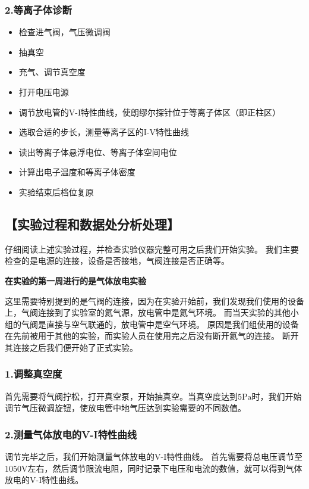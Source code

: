\documentclass[12pt,a4paper,UTF8]{ctexart}
\begin{document}
\subsubsection*{2.等离子体诊断}
\begin{itemize}
	\item 检查进气阀，气压微调阀
	\item 抽真空
	\item 充气、调节真空度
	\item 打开电压电源
	\item 调节放电管的V-I特性曲线，使朗缪尔探针位于等离子体区（即正柱区）
	\item 选取合适的步长，测量等离子区的I-V特性曲线
	\item 读出等离子体悬浮电位、等离子体空间电位
	\item 计算出电子温度和等离子体密度
	\item 实验结束后档位复原
\end{itemize}

\subsection*{【实验过程和数据处分析处理】}
仔细阅读上述实验过程，并检查实验仪器完整可用之后我们开始实验。
我们主要检查的是电源的连接，设备是否接地，气阀连接是否正确等。

\textbf{在实验的第一周进行的是气体放电实验}

这里需要特别提到的是气阀的连接，因为在实验开始前，我们发现我们使用的设备上，气阀连接到了实验室的氦气源，放电管中是氦气环境。
而当天实验的其他小组的气阀是直接与空气联通的，放电管中是空气环境。
原因是我们组使用的设备在先前被用于其他的实验，而实验人员在使用完之后没有断开氦气的连接。
断开其连接之后我们便开始了正式实验。

\subsubsection*{1.调整真空度}

首先需要将气阀拧松，打开真空泵，开始抽真空。当真空度达到$5\mathrm{Pa}$时，我们开始调节气压微调旋钮，使放电管中地气压达到实验需要的不同数值。

\subsubsection*{2.测量气体放电的V-I特性曲线} 

调节完毕之后，我们开始测量气体放电的V-I特性曲线。
首先需要将总电压调节至$1050\mathrm{V}$左右，然后调节限流电阻，同时记录下电压和电流的数值，就可以得到气体放电的V-I特性曲线。
\end{document}
